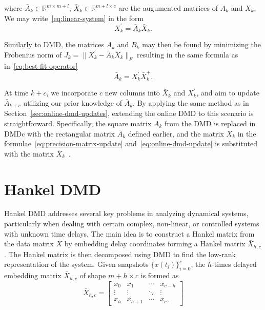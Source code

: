 where \(\bar{A}_k \in \mathbb{R}^{m \times m + l}\), \(\bar{X}_k \in \mathbb{R}^{m + l \times c}\) are the augumented matrices of \(A_k\) and \(X_k\). We may write~\eqref{eq:linear-system} in the form
\begin{equation*}
    X^\prime_k = \bar{A}_k \bar{X}_k.
\end{equation*}

Similarly to DMD, the matrices \(A_k\) and \(B_k\) may then be found by minimizing the Frobenius norm of \(J_k = \|X^\prime_k - \bar{A}_k \bar{X}_k\|_F\) resulting in the same  formula as in~\eqref{eq:best-fit-operator}
\begin{equation*}
    \bar{A}_k = X^\prime_k \bar{X}_k^+.
\end{equation*}

At time \(k+c\), we incorporate \(c\) new columns into \(\bar{X}_k\) and \(X^\prime_k\), and aim to update \(\bar{A}_{k+c}\) utilizing our prior knowledge of \(\bar{A}_k\). By applying the same method as in Section~\ref{sec:online-dmd-updates}, extending the online DMD to this scenario is straightforward. Specifically, the square matrix \(A_k\) from the DMD is replaced in DMDc with the rectangular matrix \(\bar{A}_k\) defined earlier, and the matrix \(X_k\) in the formulae~\eqref{eq:precision-matrix-update} and~\eqref{eq:online-dmd-update} is substituted with the matrix \(\bar{X}_k\)~\cite{Zhang2019}.


\section{Hankel DMD}\label{sec:hankel-dmd}

Hankel DMD addresses several key problems in analyzing dynamical systems, particularly when dealing with certain complex, non-linear, or controlled systems with unknown time delays. The main idea is to construct a Hankel matrix from the data matrix \(X\) by embedding delay coordinates forming a Hankel matrix \(\bar{X}_{h, c}\). The Hankel matrix is then decomposed using DMD to find the low-rank representation of the system. Given snapshots \({\{x(t_i)\}}^c_{i=0}\), the \(h\)-times delayed embedding matrix \(\bar{X}_{h, c}\) of shape \(m + h \times c\) is formed as
\begin{equation}\label{eq:hankel}
    \bar{X}_{h, c} = \begin{bmatrix}
        x_0    & x_1       & \cdots & x_{c - h} \\
        \vdots & \vdots    & \ddots & \vdots    \\
        x_{h}  & x_{h + 1} & \cdots & x_{c},
    \end{bmatrix}
\end{equation}

